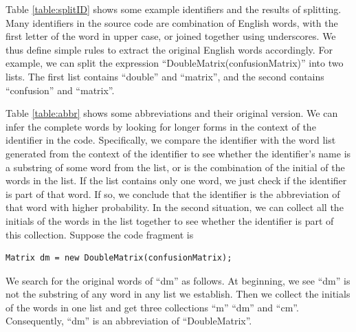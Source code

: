Table \ref{table:splitID} shows some example identifiers and the results
of splitting. Many identifiers in the source code are combination of English words,
with the first letter of the word in upper case, or joined together using
underscores. We thus define simple rules to extract the original
English words accordingly.
For example, we can split the expression ``DoubleMatrix(confusionMatrix)''
into two lists. The first list contains ``double'' and ``matrix'',
and the second contains ``confusion'' and ``matrix''.


Table \ref{table:abbr} shows some abbreviations and
their original version. We can infer the complete words by
looking for longer forms in the context of the identifier in the code.
Specifically, we compare the identifier with the word list generated from
the context of the identifier to see whether the identifier's name
is a substring of some word from the list, or is the combination of
the initial of the words in the list.
If the list contains only one word, we just check if the identifier
is part of that word. If so, we conclude that the identifier is the
abbreviation of that word with higher probability.
In the second situation, we can collect all the initials of the words
in the list together to see whether the identifier is part of
this collection. Suppose the code fragment is

\begin{lstlisting}
Matrix dm = new DoubleMatrix(confusionMatrix);
\end{lstlisting}
We search for the original words of ``dm'' as follows.
At beginning, we see ``dm'' is not the substring of any word in any list
we establish. Then we collect the initials of the words in one list and
get three collections ``m'' ``dm'' and ``cm''.
Consequently, ``dm'' is an abbreviation of ``DoubleMatrix''.

